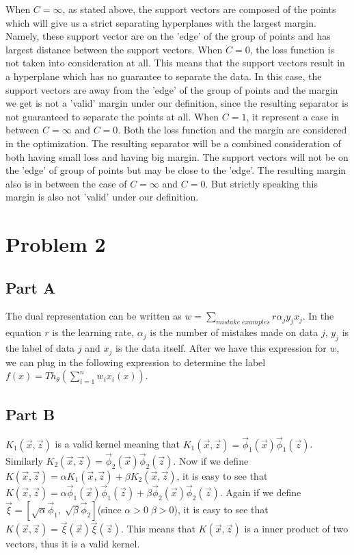 \noindent When $C=\infty$, as stated above, the support vectors are composed of the points which will give us a strict separating hyperplanes with the largest margin. Namely, these support vector are on the 'edge' of the group of points and has largest distance between the support vectors. When $C=0$, the loss function is not taken into consideration at all. This means that the support vectors result in a hyperplane which has no guarantee to separate the data. In this case, the support vectors are away from the 'edge' of the group of points and the margin we get is not a 'valid' margin under our definition, since the resulting separator is not guaranteed to separate the points at all. When $C=1$, it represent a case in between $C=\infty$ and $C=0$. Both the loss function and the margin are considered in the optimization. The resulting separator will be a combined consideration of both having small loss and having big margin. The support vectors will not be on the 'edge' of group of points but may be close to the 'edge'. The resulting margin also is in between the case of $C=\infty$ and $C=0$. But strictly speaking this margin is also not 'valid' under our definition.


\section{Problem 2}
\subsection{Part A}
The dual representation can be written as  $w=\sum_{mistake\;examples}r\alpha_jy_jx_j$. In the equation $r$ is the learning rate, $\alpha_j$ is the number of mistakes made on data $j$, $y_j$ is the label of data $j$ and $x_j$ is the data itself.
After we have this expression for $w$, we can plug in the following expression to determine the label $f(x)=Th_{\theta}(\sum_{i=1}^{n}w_ix_i(x))$.

\subsection{Part B}
$K_1(\vec{x},\vec{z})$ is a valid kernel meaning that $K_1(\vec{x},\vec{z})=\vec{\phi}_1(\vec{x})\vec{\phi}_1(\vec{z})$. Similarly $K_2(\vec{x},\vec{z})=\vec{\phi}_2(\vec{x})\vec{\phi}_2(\vec{z})$. Now if we define $ K(\vec{x},\vec{z}) = \alpha K_1(\vec{x},\vec{z}) + \beta K_2(\vec{x},\vec{z})$, it is easy to see that $K(\vec{x},\vec{z}) =\alpha\vec{\phi}_1(\vec{x})\vec{\phi}_1(\vec{z})+\beta\vec{\phi}_2(\vec{x})\vec{\phi}_2(\vec{z})$. Again if we define $\vec{\xi}=[\sqrt{\alpha}\vec{\phi}_1,\;\sqrt{\beta}\vec{\phi}_2]$(since $\alpha>0\;\beta>0$), it is easy to see that $K(\vec{x},\vec{z})=\vec{\xi}(\vec{x})\vec{\xi}(\vec{z})$. This means that $K(\vec{x},\vec{z})$ is a inner product of two vectors, thus it is a valid kernel.

